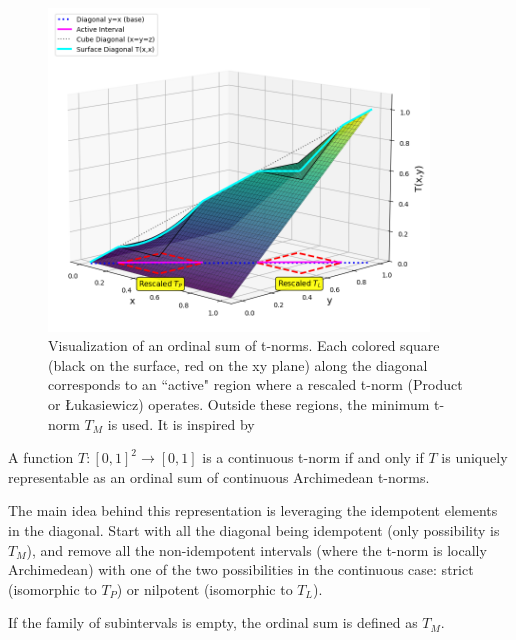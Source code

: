 \begin{figure}[!ht]
    \centering
    \includegraphics[width=0.9\textwidth]{ch1/figures/ordinal_sums.png}
    \caption{Visualization of an ordinal sum of t-norms. Each colored square (black on the surface, red on the xy plane) along the diagonal corresponds to an ``active" region where a rescaled t-norm (Product or Łukasiewicz) operates. Outside these regions, the minimum t-norm $T_M$ is used. It is inspired by \cite[Fig.~3.16]{Klement2000}}
    \label{fig:ordinal_sum_tnorm}
\end{figure}



\begin{theorem}
  A function $T: [0,1]^2 \to [0,1]$ is a continuous t-norm if and only if $T$ is uniquely representable as an ordinal sum of continuous Archimedean t-norms.
\end{theorem}

The main idea behind this representation is leveraging the idempotent elements in the diagonal. Start with all the diagonal being idempotent (only possibility is $T_M$), and remove all the non-idempotent intervals (where the t-norm is locally Archimedean) with one of the two possibilities in the continuous case: strict (isomorphic to $T_P$) or nilpotent (isomorphic to $T_L$).

\begin{remark}
  If the family of subintervals is empty, the ordinal sum is defined as $T_M$.
\end{remark}

